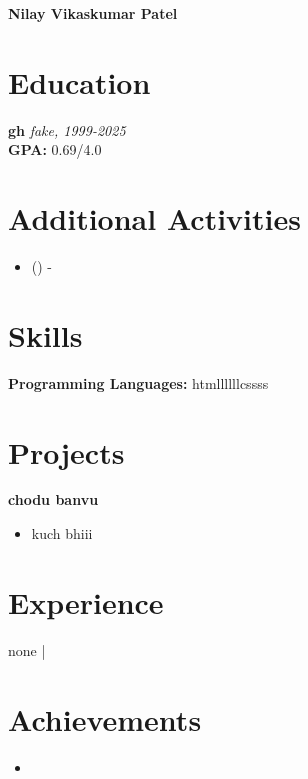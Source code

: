 \documentclass[10pt, letterpaper]{article}
\newenvironment{onecolentry}{}{} %
\newenvironment{highlights}{\begin{itemize}}{\end{itemize}} %
\begin{document}
\begin{center}
    {\LARGE\bfseries Nilay Vikaskumar Patel}\\[5pt]
    {}
\end{center}

\section{Education}
\begin{onecolentry}
    \textbf{gh} 
    \textit{fake, 1999-2025}\\
    \textbf{GPA:} 0.69/4.0
\end{onecolentry}

\section{Additional Activities}
\begin{onecolentry}
    \begin{highlights}
        \item \textbf{} () - 
    \end{highlights}
\end{onecolentry}

\section{Skills}
\textbf{Programming Languages:} htmllllllcssss\\




\section{Projects}
\begin{onecolentry}
    {\textbf{\large chodu banvu}}
    \begin{itemize}
        \item kuch bhiii
    \end{itemize}
\end{onecolentry}
\vspace{7pt}

\section{Experience}
\begin{onecolentry}
    \textbf{} \hfill none | 
\end{onecolentry}

\section{Achievements}
\begin{onecolentry}
    \begin{itemize}
        \item 
    \end{itemize}
\end{onecolentry}
\end{document}
